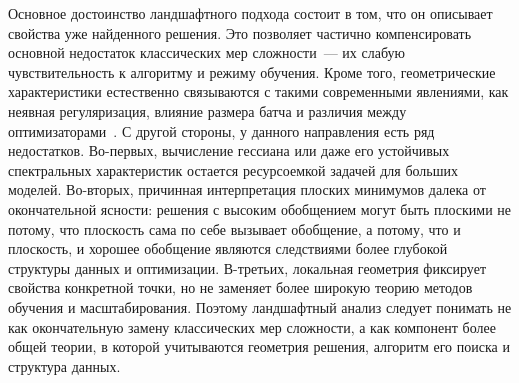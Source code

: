 Основное достоинство ландшафтного подхода состоит в том, что он описывает свойства уже найденного решения.
Это позволяет частично компенсировать основной недостаток классических мер сложности~--- их слабую чувствительность к алгоритму и режиму обучения.
Кроме того, геометрические характеристики естественно связываются с такими современными явлениями, как неявная регуляризация, влияние размера батча и различия между оптимизаторами~\cite{bousquet2002stability,hardt2016train}.
С другой стороны, у данного направления есть ряд недостатков.
Во-первых, вычисление гессиана или даже его устойчивых спектральных характеристик остается ресурсоемкой задачей для больших моделей.
Во-вторых, причинная интерпретация плоских минимумов далека от окончательной ясности: решения с высоким обобщением могут быть плоскими не потому, что плоскость сама по себе вызывает обобщение, а потому, что и плоскость, и хорошее обобщение являются следствиями более глубокой структуры данных и оптимизации.
В-третьих, локальная геометрия фиксирует свойства конкретной точки, но не заменяет более широкую теорию методов обучения и масштабирования.
Поэтому ландшафтный анализ следует понимать не как окончательную замену классических мер сложности, а как компонент более общей теории, в которой учитываются геометрия решения, алгоритм его поиска и структура данных.

